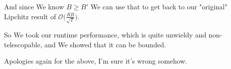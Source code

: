 \documentclass{article}
\begin{document}
And since We know $B\ge B'$ We can use that to get back to our "original" Lipchitz result of $\mathcal{O}\big(\frac{R B}{\sqrt{T}} \big)$.

So We took our runtime performance, which is quite unwieldy and non-telescopable, and We showed that it can be bounded.

Apologies again for the above, I'm sure it's wrong somehow.
		
		
		
	
\end{document}
